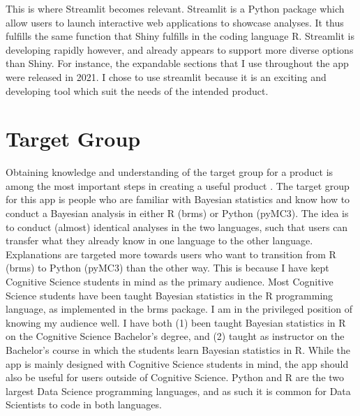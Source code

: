 \documentclass[12pt]{article}
\begin{document}
\vspace{5mm}

This is where Streamlit becomes relevant. Streamlit is a Python package which allow users
to launch interactive web applications to showcase analyses. It thus fulfills the same function
that Shiny fulfills in the coding language R. Streamlit is developing rapidly however,
and already appears to support more diverse options than Shiny. For instance,
the expandable sections that I use throughout the app were released in 2021. I chose to
use streamlit because it is an exciting and developing tool which suit the
needs of the intended product.

\section{Target Group}
Obtaining knowledge and understanding of the target group for a product is among the
most important steps in creating a useful product
\autocite[13]{mills1992macintosh}.
The target group for this app is people who are familiar with Bayesian statistics and know
how to conduct a Bayesian analysis in either R (brms) or Python (pyMC3). The idea is to
conduct (almost) identical analyses in the two languages, such that users can
transfer what they already know in one language to the other language.
Explanations are targeted more towards users who want to transition from R (brms)
to Python (pyMC3) than the other way. This is because I have kept Cognitive Science students
in mind as the primary audience. Most Cognitive Science students have been
taught Bayesian statistics in the R programming language, as implemented in the
brms package. I am in the privileged position of knowing my audience well. I
have both (1) been taught Bayesian statistics in R on the Cognitive Science
Bachelor's degree, and (2) taught as instructor on the Bachelor's course in which
the students learn Bayesian statistics in R.
While the app is mainly designed with Cognitive Science students in mind,
the app should also be useful for users outside of Cognitive Science.
Python and R are the two largest Data Science programming
languages, and as such it is common for Data Scientists to code in both
languages.
\end{document}
